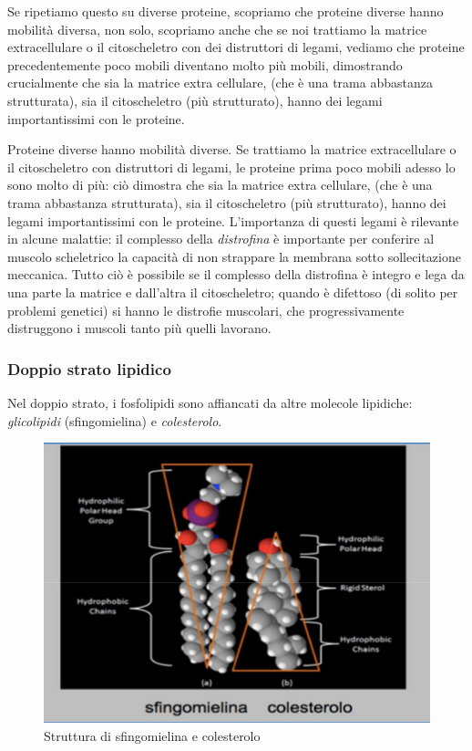 \documentclass[a4paper,12pt]{article}
\begin{document}
Se ripetiamo questo su diverse proteine, scopriamo che proteine diverse hanno mobilità diversa, non solo, scopriamo anche che se noi trattiamo la matrice extracellulare o il citoscheletro con dei distruttori di legami, vediamo che proteine precedentemente poco mobili diventano molto più mobili, dimostrando crucialmente che sia la matrice extra cellulare, (che è una trama abbastanza strutturata), sia il citoscheletro (più strutturato), hanno dei legami importantissimi con le proteine.


Proteine diverse hanno mobilità diverse. Se trattiamo la matrice extracellulare o il citoscheletro con distruttori di legami, le proteine prima poco  mobili adesso lo sono molto di più: ciò dimostra  che sia la matrice extra cellulare, (che è una trama abbastanza strutturata), sia il citoscheletro (più strutturato), hanno dei legami importantissimi con le proteine.
L'importanza di questi legami è rilevante in alcune malattie: il complesso della \emph{distrofina} è importante per conferire al muscolo scheletrico la capacità di non strappare la membrana sotto sollecitazione meccanica. Tutto ciò è possibile se il complesso della distrofina è integro e lega da una parte la matrice e dall'altra il citoscheletro; quando è difettoso (di solito per problemi genetici) si hanno le distrofie muscolari, che progressivamente distruggono i muscoli tanto più quelli lavorano.

\subsubsection{Doppio strato lipidico}
Nel doppio strato, i fosfolipidi sono affiancati da altre molecole lipidiche: \emph{glicolipidi} (sfingomielina) e \emph{colesterolo}. 

\begin{figure}[H]
\centering
\includegraphics[scale=0.5]{immagine/sfingomielina.jpg}
\caption{Struttura di sfingomielina e colesterolo}
\end{figure}
\end{document}

